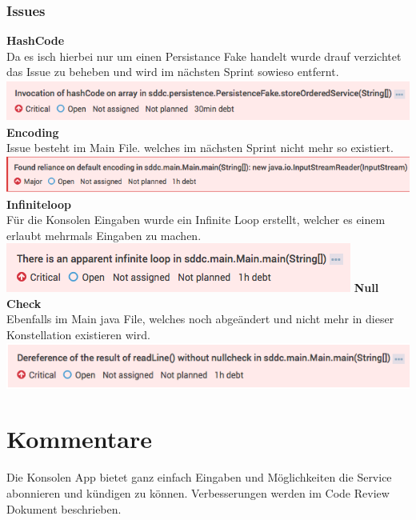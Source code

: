 \documentclass[11pt]{scrartcl}
\begin{document}
\subsubsection{Issues}
\textbf{HashCode}\\
Da es isch hierbei nur um einen Persistance Fake handelt wurde drauf verzichtet 
das Issue zu beheben und wird im nächsten Sprint sowieso entfernt.
\newline
\includegraphics[width=\textwidth]{hashcode}
\newline
\textbf{Encoding}\\
Issue besteht im Main File. welches im nächsten Sprint nicht mehr so existiert.
\newline
\includegraphics[width=\textwidth]{encoding}
\newline
\textbf{Infiniteloop}\\
Für die Konsolen Eingaben wurde ein Infinite Loop erstellt, welcher es einem 
erlaubt mehrmals Eingaben zu machen.
\newline
\includegraphics[width=\textwidth]{infiniteloop}
\newline
\textbf{Null Check}\\
Ebenfalls im Main java File, welches noch abgeändert und nicht mehr in dieser 
Konstellation existieren wird.
\newline
\includegraphics[width=\textwidth]{nullcheck}

\section{Kommentare}

Die Konsolen App bietet ganz einfach Eingaben und Möglichkeiten die Service 
abonnieren und kündigen zu können.
Verbesserungen werden im Code Review Dokument beschrieben.
\end{document}
